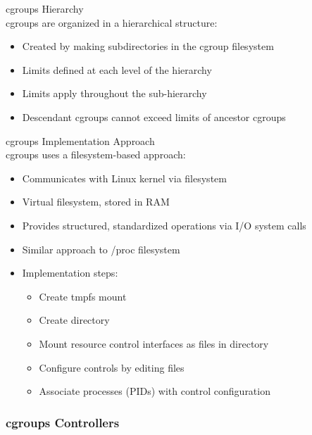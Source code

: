 \begin{definition}{cgroups Hierarchy}\\
    cgroups are organized in a hierarchical structure:
    \begin{itemize}
        \item Created by making subdirectories in the cgroup filesystem
        \item Limits defined at each level of the hierarchy
        \item Limits apply throughout the sub-hierarchy
        \item Descendant cgroups cannot exceed limits of ancestor cgroups
    \end{itemize}
\end{definition}

\begin{concept}{cgroups Implementation Approach}\\
    cgroups uses a filesystem-based approach:
    \begin{itemize}
        \item Communicates with Linux kernel via filesystem
        \item Virtual filesystem, stored in RAM
        \item Provides structured, standardized operations via I/O system calls
        \item Similar approach to /proc filesystem
        \item Implementation steps:
            \begin{itemize}
                \item Create tmpfs mount
                \item Create directory
                \item Mount resource control interfaces as files in directory
                \item Configure controls by editing files
                \item Associate processes (PIDs) with control configuration
            \end{itemize}
    \end{itemize}
\end{concept}



\multend

\subsubsection{cgroups Controllers}

